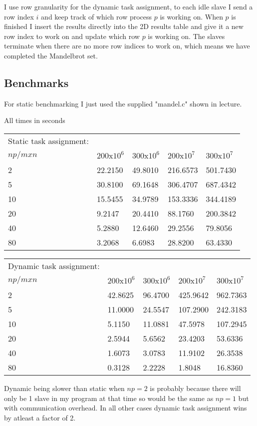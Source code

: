 \documentclass{article}
\begin{document}
I use row granularity for the dynamic task assignment, to each idle slave I send a row index $i$ and keep track of which row process $p$ is working on. When $p$ is finished I insert the results directly into the 2D results table and give it a new row index to work on and update which row $p$ is working on. The slaves terminate when there are no more row indices to work on, which means we have completed the Mandelbrot set.

\subsection*{Benchmarks}

For static benchmarking I just used the supplied "mandel.c" shown in lecture.

All times in seconds
\begin{table}[h]
\begin{tabular}{lllll}
Static task assignment: & & & & \\
$np/mxn$ & 200x$10^{6}$ & 300x$10^{6}$ & 200x$10^{7}$ & 300x$10^{7}$\\
2 & 22.2150 & 49.8010 & 216.6573 & 501.7430\\
5 & 30.8100 & 69.1648 & 306.4707 & 687.4342\\
10 & 15.5455 & 34.9789 & 153.3336  & 344.4189\\
20 & 9.2147 & 20.4410 & 88.1760 & 200.3842\\
40 & 5.2880 & 12.6460 & 29.2556  & 79.8056\\
80 & 3.2068 & 6.6983 & 28.8200 & 63.4330
\end{tabular}
\end{table}

\begin{table}[h]
\begin{tabular}{lllll}
Dynamic task assignment: & & & &\\
$np/mxn$ & 200x$10^{6}$ & 300x$10^{6}$ & 200x$10^{7}$ & 300x$10^{7}$\\
2 & 42.8625 & 96.4700 & 425.9642& 962.7363\\
5 & 11.0000 & 24.5547 & 107.2900 & 242.3183\\
10 & 5.1150 & 11.0881 & 47.5978 & 107.2945\\
20 & 2.5944 & 5.6562 & 23.4203 & 53.6336\\
40 & 1.6073 & 3.0783 & 11.9102 & 26.3538\\
80 & 0.3128 & 2.2228 & 1.8048 & 16.8360
\end{tabular}
\end{table}

Dynamic being slower than static when $np=2$ is probably because there will only be 1 slave in my program at that time so would be the same as $np=1$ but with communication overhead. In all other cases dynamic task assignment wins by atleast a factor of 2.
\end{document}
